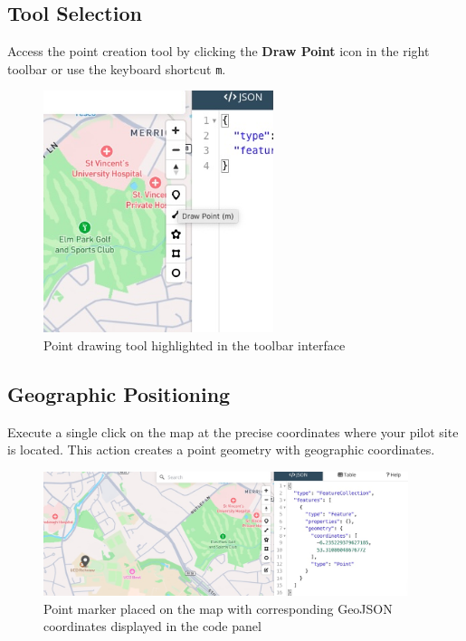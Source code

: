 \documentclass[11pt,a4paper]{article}
\begin{document}
\subsection{Tool Selection}

Access the point creation tool by clicking the \textbf{Draw Point} icon in the right toolbar or use the keyboard shortcut \texttt{m}.

\begin{figure}[H]
    \centering
    \includegraphics[width=0.6\textwidth]{img/step2_1.jpg}
    \caption{Point drawing tool highlighted in the toolbar interface}
    \label{fig:step2_1}
\end{figure}

\subsection{Geographic Positioning}

Execute a single click on the map at the precise coordinates where your pilot site is located. This action creates a point geometry with geographic coordinates.

\begin{figure}[H]
    \centering
    \includegraphics[width=0.95\textwidth]{img/step2_2.jpg}
    \caption{Point marker placed on the map with corresponding GeoJSON coordinates displayed in the code panel}
    \label{fig:step2_2}
\end{figure}
\end{document}
